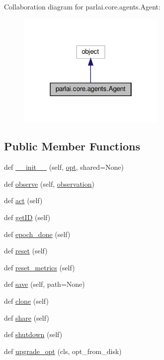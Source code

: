 Collaboration diagram for parlai.\+core.\+agents.\+Agent\+:
\nopagebreak
\begin{figure}[H]
\begin{center}
\leavevmode
\includegraphics[width=202pt]{classparlai_1_1core_1_1agents_1_1Agent__coll__graph}
\end{center}
\end{figure}
\subsection*{Public Member Functions}
\begin{DoxyCompactItemize}
\item 
def \hyperlink{classparlai_1_1core_1_1agents_1_1Agent_aa7992ab392e2803607937e805ceb176f}{\+\_\+\+\_\+init\+\_\+\+\_\+} (self, \hyperlink{classparlai_1_1core_1_1agents_1_1Agent_ab3b45d2754244608c75d4068b90cd051}{opt}, shared=None)
\item 
def \hyperlink{classparlai_1_1core_1_1agents_1_1Agent_a98041e2d186aa81bd5e1649a91f623bc}{observe} (self, \hyperlink{classparlai_1_1core_1_1agents_1_1Agent_aedbecc4b4aa7af7413882a0429e0f1db}{observation})
\item 
def \hyperlink{classparlai_1_1core_1_1agents_1_1Agent_a6a8abe0a98dd59bc39c9f12b163072db}{act} (self)
\item 
def \hyperlink{classparlai_1_1core_1_1agents_1_1Agent_a29e1cdd729ac4236f8bae90b2e66fa04}{get\+ID} (self)
\item 
def \hyperlink{classparlai_1_1core_1_1agents_1_1Agent_a40157e237ea85d75ebc3fd248c7a1a1b}{epoch\+\_\+done} (self)
\item 
def \hyperlink{classparlai_1_1core_1_1agents_1_1Agent_a27cb8206372681605b00dc28b81a7c39}{reset} (self)
\item 
def \hyperlink{classparlai_1_1core_1_1agents_1_1Agent_aaefcbd7c61d319b368b3ee13997c8c99}{reset\+\_\+metrics} (self)
\item 
def \hyperlink{classparlai_1_1core_1_1agents_1_1Agent_a51e706e3e5389c9b48c7a1589d97ec99}{save} (self, path=None)
\item 
def \hyperlink{classparlai_1_1core_1_1agents_1_1Agent_a2525db5bdd19a3bf5b0669bfa158f9ff}{clone} (self)
\item 
def \hyperlink{classparlai_1_1core_1_1agents_1_1Agent_afbbb06bf0f46ff927c8b186726a68b47}{share} (self)
\item 
def \hyperlink{classparlai_1_1core_1_1agents_1_1Agent_a801e5ca2a5e8e96a72f0c04549008e8f}{shutdown} (self)
\item 
def \hyperlink{classparlai_1_1core_1_1agents_1_1Agent_a005f62f977e8a7ebf91b9646307153bc}{upgrade\+\_\+opt} (cls, opt\+\_\+from\+\_\+disk)
\end{DoxyCompactItemize}

